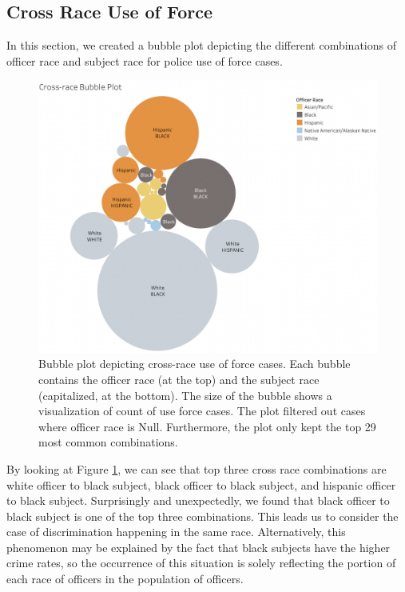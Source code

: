 \documentclass[10pt]{article}
\begin{document}
\subsection{Cross Race Use of Force}

In this section, we created a bubble plot depicting the different combinations of officer race and subject race for police use of force cases.

\begin{figure}[h]
\centering
\includegraphics[scale=0.38]{image3.png}
\caption{Bubble plot depicting cross-race use of force cases. Each bubble contains the officer race (at the top) and the subject race (capitalized, at the bottom). The size of the bubble shows a visualization of count of use force cases. The plot filtered out cases where officer race is Null. Furthermore, the plot only kept the top 29 most common combinations.}
\label{fig:crossrace}
\end{figure}


By looking at Figure \ref{fig:crossrace}, we can see that top three cross race combinations are white officer to black subject, black officer to black subject, and hispanic officer to black subject. Surprisingly and unexpectedly, we found that black officer to black subject is one of the top three combinations. This leads us to consider the case of discrimination happening in the same race. Alternatively, this phenomenon may be explained by the fact that black subjects have the higher crime rates, so the occurrence of this situation is solely reflecting the portion of each race of officers in the population of officers.
\end{document}
